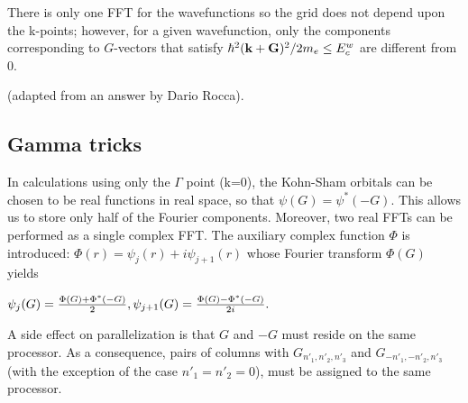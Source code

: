 \documentclass[12pt,a4paper]{article}
\begin{document}
There is only one FFT for the wavefunctions so the grid does not depend
upon the k-points; however, for a given wavefunction, only the components
corresponding to $G$-vectors that satisfy
$ { \hbar^2 ({\bf k}+{\bf G})^2 / 2m_e} \le E^w_c$
are different from 0.

(adapted from an answer by Dario Rocca).

\subsection{Gamma tricks}

In calculations using only the $\Gamma$ point (k=0),
the Kohn-Sham orbitals can be chosen to be real functions in
real space, so that
$
  \psi(G) = \psi^*(-G).
$
This allows us to store only half of the Fourier components.
Moreover, two real FFTs can be performed as a single complex FFT.
The auxiliary complex function $\Phi$ is introduced:
$
    \Phi(r) = \psi_j(r)+ i \psi_{j+1}(r)
$
whose Fourier transform $\Phi(G)$ yields

$
   \psi_j    (G) =  {\Phi(G) + \Phi^*(-G)\over 2},
   \psi_{j+1}(G) =  {\Phi(G) - \Phi^*(-G)\over 2i}.
$

A side effect on parallelization is that $G$ and $-G$ must
reside on the same processor. As a consequence, pairs of columns
with $G_{n'_1,n'_2,n'_3}$ and $G_{-n'_1,-n'_2,n'_3}$
(with the exception of the case $n'_1=n'_2=0$),
must be assigned to the same processor.
\end{document}
